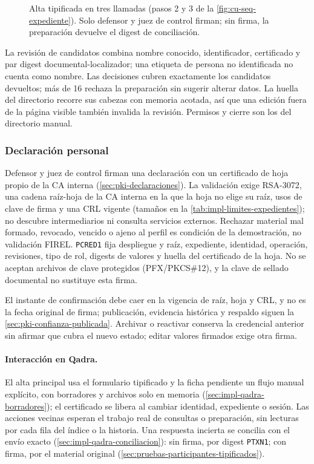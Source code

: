 \begin{figure}[!t]
  \centering
  
  \caption{Alta tipificada en tres llamadas (pasos 2 y 3 de la \cref{fig:cu-seq-expediente}). Solo defensor y juez de control firman; sin firma, la preparación devuelve el digest de conciliación.}
  \label{fig:impl-propuesta}
\end{figure}

La revisión de candidatos combina nombre conocido, identificador, certificado y par digest documental-localizador; una etiqueta de persona no identificada no cuenta como nombre. Las decisiones cubren exactamente los candidatos devueltos; más de 16 rechaza la preparación sin sugerir alterar datos. La huella del directorio recorre sus cabezas con memoria acotada, así que una edición fuera de la página visible también invalida la revisión. Permisos y cierre son los del directorio manual.

\subsubsection{Declaración personal}\label{sec:impl-declaracion-participante}

Defensor y juez de control firman una declaración con un certificado de hoja propio de la CA interna (\cref{sec:pki-declaraciones}). La validación exige RSA-3072, una cadena raíz-hoja de la CA interna en la que la hoja no elige su raíz, usos de clave de firma y una CRL vigente (tamaños en la \cref{tab:impl-limites-expedientes}); no descubre intermediarios ni consulta servicios externos. Rechazar material mal formado, revocado, vencido o ajeno al perfil es condición de la demostración, no validación FIREL. \texttt{PCRED1} fija despliegue y raíz, expediente, identidad, operación, revisiones, tipo de rol, digests de valores y huella del certificado de la hoja. No se aceptan archivos de clave protegidos (PFX/PKCS\#12), y la clave de sellado documental no sustituye esta firma.

El instante de confirmación debe caer en la vigencia de raíz, hoja y CRL, y no es la fecha original de firma; publicación, evidencia histórica y respaldo siguen la \cref{sec:pki-confianza-publicada}. Archivar o reactivar conserva la credencial anterior sin afirmar que cubra el nuevo estado; editar valores firmados exige otra firma.

\paragraph{Interacción en Qadra.} El alta principal usa el formulario tipificado y la ficha pendiente un flujo manual explícito, con borradores y archivos solo en memoria (\cref{sec:impl-qadra-borradores}); el certificado se libera al cambiar identidad, expediente o sesión. Las acciones vecinas esperan el trabajo real de consultas o preparación, sin lecturas por cada fila del índice o la historia. Una respuesta incierta se concilia con el envío exacto (\cref{sec:impl-qadra-conciliacion}): sin firma, por digest \texttt{PTXN1}; con firma, por el material original (\cref{sec:pruebas-participantes-tipificados}).
